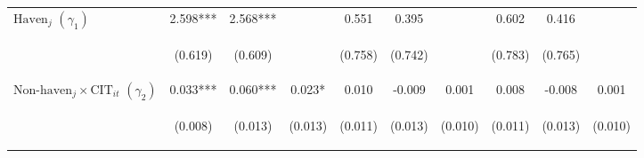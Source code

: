 \begin{center}
\begin{tabular}{lccccccccc}
$\text{Haven}_j$ $(\gamma_1)$ & 2.598*** & 2.568*** &  & 0.551 & 0.395 &  & 0.602 & 0.416 &  \\
\vspace{4pt} & \begin{footnotesize}(0.619)\end{footnotesize} & \begin{footnotesize}(0.609)\end{footnotesize} & \begin{footnotesize}\end{footnotesize} & \begin{footnotesize}(0.758)\end{footnotesize} & \begin{footnotesize}(0.742)\end{footnotesize} & \begin{footnotesize}\end{footnotesize} & \begin{footnotesize}(0.783)\end{footnotesize} & \begin{footnotesize}(0.765)\end{footnotesize} & \begin{footnotesize}\end{footnotesize} \\
$\text{Non-haven}_j\times\text{CIT}_{it}$ $ (\gamma_2)$ & 0.033*** & 0.060*** & 0.023* & 0.010 & -0.009 & 0.001 & 0.008 & -0.008 & 0.001 \\
\vspace{4pt} & \begin{footnotesize}(0.008)\end{footnotesize} & \begin{footnotesize}(0.013)\end{footnotesize} & \begin{footnotesize}(0.013)\end{footnotesize} & \begin{footnotesize}(0.011)\end{footnotesize} & \begin{footnotesize}(0.013)\end{footnotesize} & \begin{footnotesize}(0.010)\end{footnotesize} & \begin{footnotesize}(0.011)\end{footnotesize} & \begin{footnotesize}(0.013)\end{footnotesize} & \begin{footnotesize}(0.010)\end{footnotesize} \\

\end{tabular}
\end{center}
